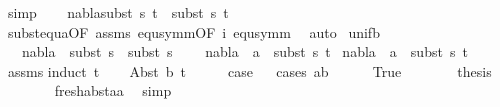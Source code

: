 \begin{isabellebody}
\ simp\isanewline
\ \ \isamarkupfalse%
\ {\isachardoublequoteopen}{\isacharparenleft}{\kern0pt}nabla{\isasymturnstile}subst\ s{}\ t{}\ {\isasymapprox}\ subst\ s{}\ t{}{\isacharparenright}{\kern0pt}{\isachardoublequoteclose}\isanewline
\ \ \ \ \isamarkupfalse%
\ subst{\isacharunderscore}{\kern0pt}equ{\isacharunderscore}{\kern0pt}a{\isacharbrackleft}{\kern0pt}OF\ assms{\isacharparenleft}{\kern0pt}{}{\isacharparenright}{\kern0pt}\ equ{\isacharunderscore}{\kern0pt}symm{\isacharbrackleft}{\kern0pt}OF\ i{\isacharbrackright}{\kern0pt}{\isacharbrackright}{\kern0pt}\ equ{\isacharunderscore}{\kern0pt}symm\ \isamarkupfalse%
\ auto\isanewline
{}\isamarkupfalse%
%
\endisatagproof
{\isafoldproof}%
%
\isadelimproof
\isanewline
%
\endisadelimproof
\isanewline
{}\isamarkupfalse%
\ unif{\isacharunderscore}{\kern0pt}{}b{\isacharcolon}{\kern0pt}\isanewline
\ \ \ {\isachardoublequoteopen}nabla\ {\isasymTurnstile}\ subst\ s{}\ {\isasymapprox}\ subst\ s{}{\isachardoublequoteclose}\ \isanewline
\ \ \ {\isachardoublequoteopen}nabla\ {\isasymturnstile}\ a\ {\isasymsharp}\ subst\ s{}\ t{\isachardoublequoteclose}\isanewline
{}\ {\isachardoublequoteopen}nabla\ {\isasymturnstile}\ a\ {\isasymsharp}\ subst\ s{}\ t{\isachardoublequoteclose}\ \isanewline
%
\isadelimproof
\ \ %
\endisadelimproof
%
\isatagproof
{}\isamarkupfalse%
\ assms\isanewline
{}\isamarkupfalse%
{\isacharparenleft}{\kern0pt}induct\ t{\isacharparenright}{\kern0pt}\isanewline
\ \ \isamarkupfalse%
\ {\isacharparenleft}{\kern0pt}Abst\ b\ t{\isacharprime}{\kern0pt}{\isacharparenright}{\kern0pt}\isanewline
\ \ \isamarkupfalse%
\ \isamarkupfalse%
\ {\isacharquery}{\kern0pt}case\isanewline
\ \ \isamarkupfalse%
{\isacharparenleft}{\kern0pt}cases\ {\isachardoublequoteopen}a{\isacharequal}{\kern0pt}b{\isachardoublequoteclose}{\isacharparenright}{\kern0pt}\isanewline
\ \ \ \ \isamarkupfalse%
\ True\isanewline
\ \ \ \ \isamarkupfalse%
\ \isamarkupfalse%
\ {\isacharquery}{\kern0pt}thesis\ \isanewline
\ \ \ \ \ \ \isamarkupfalse%
\ fresh{\isacharunderscore}{\kern0pt}abst{\isacharunderscore}{\kern0pt}aa\ \isamarkupfalse%
\ simp\ \isanewline

\end{isabellebody}
